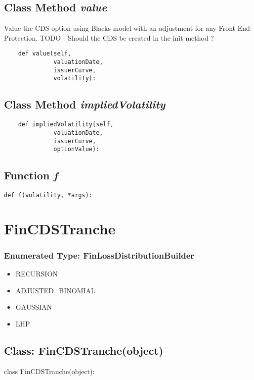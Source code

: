 \documentclass[twoside,11pt]{book}
\begin{document}
\subsection{Class Method {\it value}}
Value the CDS option using Blacks model with an adjustment for any Front End Protection. TODO - Should the CDS be created in the init method ? 

\begin{lstlisting}
    def value(self, 
              valuationDate,
              issuerCurve,
              volatility):
\end{lstlisting}

\subsection{Class Method {\it impliedVolatility}}


\begin{lstlisting}
    def impliedVolatility(self,
              valuationDate,
              issuerCurve,
              optionValue):
\end{lstlisting}

\subsection{Function {\it f}}


\begin{lstlisting}
def f(volatility, *args):
\end{lstlisting}

\newpage
\section{FinCDSTranche}

\subsubsection{Enumerated Type: FinLossDistributionBuilder}
\begin{itemize}
\item{RECURSION}
\item{ADJUSTED\_BINOMIAL}
\item{GAUSSIAN}
\item{LHP}
\end{itemize}

\subsection{Class: FinCDSTranche(object)}
class FinCDSTranche(object):
\end{document}
